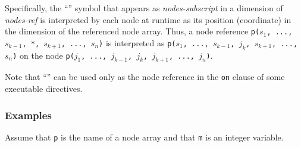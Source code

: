Specifically, the ``{\tt *}'' symbol that appears as {\it nodes-subscript}
in a dimension of {\it nodes-ref} is interpreted by each node at runtime
as its position (coordinate) in the dimension of the referenced node
array.
%
Thus, a node reference {\tt p($s_1$, ..., $s_{k-1}$, *, $s_{k+1}$, ..., $s_n$)} 
is interpreted as {\tt p($s_1$, ..., $s_{k-1}$, $j_k$, $s_{k+1}$, ..., $s_n$)} 
on the node {\tt p($j_1$, ..., $j_{k-1}$, $j_k$, $j_{k+1}$, ..., $j_n$)}.

%

Note that ``{\tt *}'' can be used only as the node reference in
the {\tt on} clause of some executable directives.


\subsubsection*{Examples}

Assume that {\tt p} is the name of a node array and that {\tt m} is an
integer variable.

